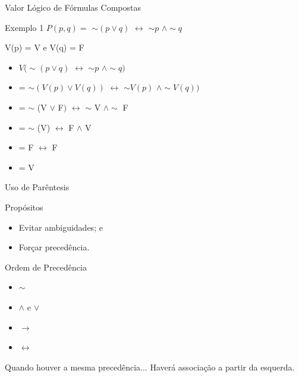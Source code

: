 \documentclass[xcolor=dvipsnames,table]{beamer}
\begin{document}
\begin{frame}{Valor Lógico de Fórmulas Compostas}
	\begin{block}{Exemplo 1}
		$P(p,q) =$ $\sim (p \vee q)$ $\leftrightarrow$ $\sim p$ $\wedge \sim q$
	\end{block} \pause
	\begin{block}{V(p) = V e V(q) = F}
		\begin{itemize}
			\item $V(\sim (p \vee q)$ $\leftrightarrow$ $\sim p$ $\wedge \sim q)$	\pause
			\item = $\sim (V(p) \vee V(q))$ $\leftrightarrow$ $\sim V(p)$ $\wedge \sim V(q))$	\pause
			\item = $\sim$ (V $\vee$ F$)$ $\leftrightarrow$ $\sim$ V $\wedge \sim$ F \pause
			\item = $\sim$ (V) $\leftrightarrow$ F $\wedge$ V \pause
			\item = F $\leftrightarrow$ F \pause
			\item = V
		\end{itemize}
	\end{block}
\end{frame}

\begin{frame}{Uso de Parêntesis}
	\begin{block}{Propósitos}
		\begin{itemize}[label=-]
			\item Evitar ambiguidades; e
			\item Forçar precedência.
		\end{itemize}
	\end{block} \pause
	\begin{block}{Ordem de Precedência}
		\begin{itemize}
			\item[(1)] $\sim$
			\item[(2)] $\wedge$ e $\vee$
			\item[(3)] $\rightarrow$
			\item[(4)] $\leftrightarrow$
		\end{itemize}
	\end{block} \pause
	\begin{block}{Quando houver a mesma precedência...}
		Haverá associação a partir da esquerda.
	\end{block}
\end{frame}
	
	\begin{frame}
		\titlepage
	\end{frame}
	
\end{document}

